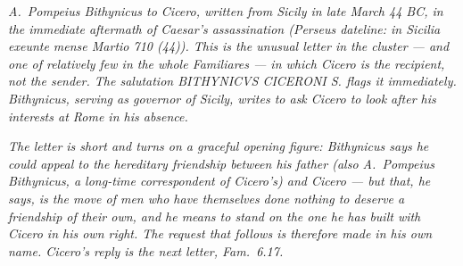 
\textit{A.~Pompeius Bithynicus to Cicero, written from Sicily in late
March 44 BC, in the immediate aftermath of Caesar's assassination
(Perseus dateline: \textit{in Sicilia exeunte mense Martio 710
(44)}). This is the unusual letter in the cluster --- and one of
relatively few in the whole \textit{Familiares} --- in which Cicero
is the recipient, not the sender. The salutation
\textit{BITHYNICVS CICERONI S.} flags it immediately. Bithynicus,
serving as governor of Sicily, writes to ask Cicero to look after
his interests at Rome in his absence.}

\textit{The letter is short and turns on a graceful opening figure:
Bithynicus says he could appeal to the hereditary friendship between
his father (also A.~Pompeius Bithynicus, a long-time correspondent
of Cicero's) and Cicero --- but that, he says, is the move of men
who have themselves done nothing to deserve a friendship of their
own, and he means to stand on the one he has built with Cicero in
his own right. The request that follows is therefore made in his
own name. Cicero's reply is the next letter, \textit{Fam.}~6.17.}
